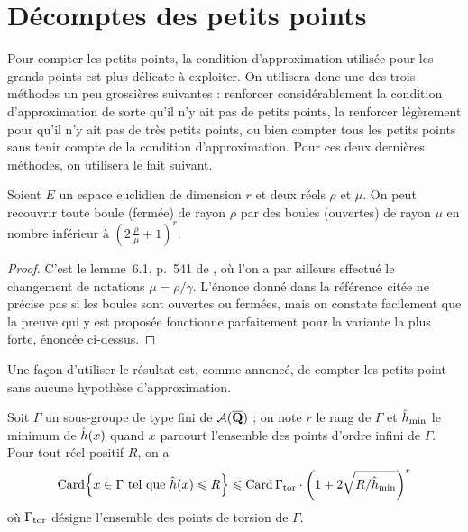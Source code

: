 
\section{Décomptes des petits points}
\label{sec:small-points}

Pour compter les petits points, la condition d'approximation utilisée pour les
grands points est plus délicate à exploiter. On utilisera donc une des trois
méthodes un peu grossières suivantes : renforcer considérablement la condition
d'approximation de sorte qu'il n'y ait pas de petits points, la renforcer
légèrement pour qu'il n'y ait pas de très petits points, ou bien compter tous
les petits points sans tenir compte de la condition d'approximation. Pour ces
deux dernières méthodes, on utilisera le fait suivant.

\begin{fact}
  Soient \( E \) un espace euclidien de dimension \( r \) et deux réels \(
    \rho \) et \( \mu \). On peut recouvrir toute boule (fermée) de rayon \(
    \rho \) par des boules (ouvertes) de rayon \( \mu \) en nombre inférieur à
  \( ( 2 \, \frac\rho\mu + 1 )^r \).
\end{fact}

\begin{proof}
  C'est le lemme~6.1, p.~541 de \cite{remdcl}, où l'on a par ailleurs effectué
  le changement de notations \( \mu = \rho / \gamma \).  L'énonce donné dans
  la référence citée ne précise pas si les boules sont ouvertes ou fermées,
  mais on constate facilement que la preuve qui y est proposée fonctionne
  parfaitement pour la variante la plus forte, énoncée ci-dessus.
\end{proof}

Une façon d'utiliser le résultat est, comme annoncé, de compter les petits
point sans aucune hypothèse d'approximation.

\begin{coro}
  Soit \( \Gamma \) un sous-groupe de type fini de \( \mathcal A(\overline{{\mathbf{Q}}}) \) ; on note
  \( r \) le rang de \( \Gamma \) et \( \hat h_{\mathrm{min}} \) le minimum de \( \hat h (x) \)
  quand \( x \) parcourt l'ensemble des points d'ordre infini de \( \Gamma \).
  Pour tout réel positif \( R \), on a
  \begin{equation}
    \card \set*{
      x \in \Gamma
      \text{ tel que }
      \hautn x \le R
    }
    \le
    \card \Gamma_\torsion
    \cdot
    \left( 1 + 2\sqrt{R / \hmin} \right)^r
  \end{equation}
  où \( \Gamma_{\mathrm{tor}} \) désigne l'ensemble des points de torsion de \(
    \Gamma \).
\end{coro}

